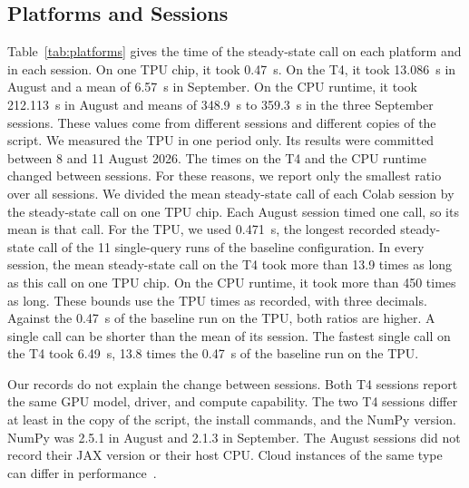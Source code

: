 \subsection{Platforms and Sessions}\label{sec:res-platforms}
Table~\ref{tab:platforms} gives the time of the steady-state call on each platform and in each session. On one TPU chip, it took 0.47~s. %
On the T4, it took 13.086~s in August and a mean of 6.57~s in September. %
On the CPU runtime, it took 212.113~s in August and means of 348.9~s to 359.3~s in the three September sessions. %
These values come from different sessions and different copies of the script. We measured the TPU in one period
only. Its results were committed between 8 and 11 August 2026. %
The times on the T4 and the CPU runtime changed between sessions. For these reasons, we report only the smallest ratio
over all sessions. We divided the mean steady-state call of each Colab session by the steady-state call on one TPU
chip. Each August session timed one call, so its mean is that call.
For the TPU, we used 0.471~s, the longest recorded steady-state call of the 11 single-query runs of the baseline configuration. %
In every session, the mean steady-state call on the T4 took more than 13.9 times as long as this call on one TPU chip. %
On the CPU runtime, it took more than 450 times as long. %
These bounds use the TPU times as recorded, with three decimals. Against the 0.47~s of the baseline run on the TPU, both ratios are higher. %
A single call can be shorter than the mean of its session. The fastest single call on the T4 took 6.49~s, 13.8 times the 0.47~s of the baseline run on the TPU. %

Our records do not explain the change between sessions. Both T4 sessions report the same GPU model, driver, and
compute capability. The two T4 sessions differ at least in the copy of the script, the install commands, and the NumPy version.
NumPy was 2.5.1 in August and 2.1.3 in September. %
The August sessions did not record their JAX version or their host CPU. Cloud instances of the same type can differ in performance~\cite{leitner2016patterns}.

